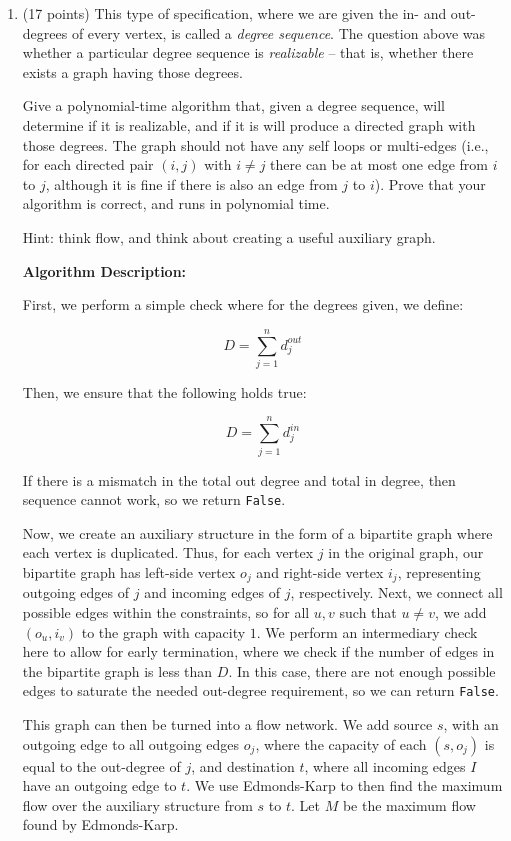 \documentclass[11pt]{article}
\begin{document}
\begin{enumerate}
\bigbreak

\item (17 points) This type of specification, where we are given the in- and out-degrees of every vertex, is called a \emph{degree sequence}. 
The question above was whether a particular degree sequence is \emph{realizable} -- that is, whether there exists a graph having those degrees.

Give a polynomial-time algorithm that, given a degree sequence, will determine if it is realizable, and if it is will produce a directed graph 
with those degrees. The graph should not have any self loops or multi-edges (i.e., for each directed pair $(i,j)$ with $i \neq j$ there can be 
at most one edge from $i$ to $j$, although it is fine if there is also an edge from $j$ to $i$). Prove that your algorithm is correct, 
and runs in polynomial time.

Hint: think flow, and think about creating a useful auxiliary graph.

\bigbreak

\textbf{Algorithm Description:}

First, we perform a simple check where for the degrees given, we define:

$$D = \sum_{j=1}^{n} d_j^{out}$$

Then, we ensure that the following holds true:

$$D = \sum_{j=1}^{n} d_j^{in}$$

If there is a mismatch in the total out degree and total in degree, then sequence cannot work, so we return \texttt{False}.

Now, we create an auxiliary structure in the form of a bipartite graph where each vertex is duplicated. Thus, for each vertex $j$ in the original graph, 
our bipartite graph has left-side vertex $o_j$ and right-side vertex $i_j$, representing outgoing edges of $j$ and incoming edges of $j$, respectively. 
Next, we connect all possible edges within the constraints, so for all $u, v$ such that $u \neq v$, we add $(o_u, i_v)$ to the graph with capacity $1$. 
We perform an intermediary check here to allow for early termination, where we check if the number of edges in the bipartite graph is less than $D$. 
In this case, there are not enough possible edges to saturate the needed out-degree requirement, so we can return \texttt{False}.

This graph can then be turned into a flow network. We add source $s$, with an outgoing edge to all outgoing edges $o_j$, where the capacity of 
each $(s, o_j)$ is equal to the out-degree of $j$, and destination $t$, where all incoming edges $I$ have an outgoing edge to $t$. 
We use Edmonds-Karp to then find the maximum flow over the auxiliary structure from $s$ to $t$. Let $M$ be the maximum flow found by Edmonds-Karp.


\end{enumerate}
\end{document}
